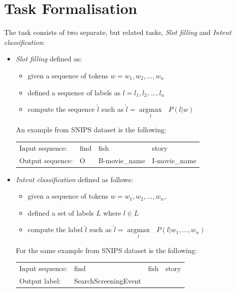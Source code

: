 \documentclass[a4paper]{article}
\begin{document}
\section{Task Formalisation}
The task consists of two separate, but related tasks, \emph{Slot filling} and \emph{Intent classification}:
\begin{itemize}

\item{\emph{Slot filling}}
defined as: 
\begin{itemize}
	\item given a sequence of tokens $w = {w_1, w_2, ..., w_n}$
	\item defined a sequence of labels as $l = {l_1, l_2, ..., l_n}$
	\item compute the sequence $\hat{l}$ such as $\hat{l} = \underset{l}{\operatorname{argmax}}\text{ }P(l|w)$ 
\end{itemize}


An example from SNIPS dataset is the following: 

\begin{table}[h!]
	\centering
	\begin{adjustbox}{max width=0.5\textwidth}
		\begin{tabular}{*{4}{l}}%
			\hline
			Input sequence: & find & fish & story \\
			Output sequence: & O & B-movie\_name & I-movie\_name \\
			\hline
		\end{tabular}
	\end{adjustbox}
	\label{tab:slot_table}
\end{table}

\item{\emph{Intent classification}}
defined as follows:\begin{itemize}
\item given a sequence of tokens $w = {w_1, w_2, ..., w_n}$,
\item defined a set of labels $L$ where $l \in L$
\item compute the label $\hat{l}$ such as $\hat{l} = \underset{l}{\operatorname{argmax}}\text{ }P(l|w_1,...,w_n)$ 
\end{itemize}

For the same example from SNIPS dataset is the following:

\begin{table}[h!]
	\centering
	\begin{adjustbox}{max width=0.5\textwidth}
		\begin{tabular}{*{4}{l}}%
			\hline
			Input sequence: & find & fish & story\\
			Output label: & SearchScreeningEvent &  & \\
			\hline
		\end{tabular}
	\end{adjustbox}
	\label{tab:intent_table}
\end{table}


\end{itemize}
\end{document}

